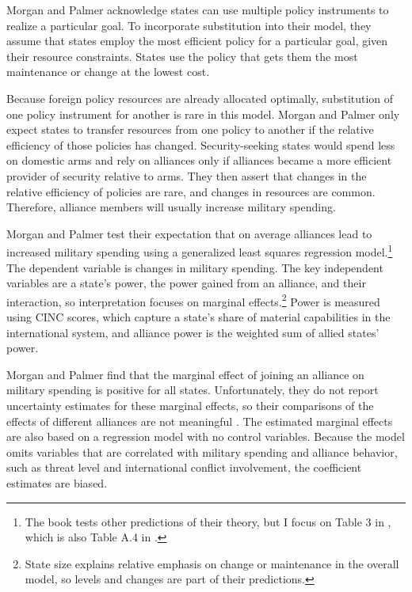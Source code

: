 \documentclass[12pt]{article}
\begin{document}
Morgan and Palmer acknowledge states can use multiple policy instruments to realize a particular goal. 
To incorporate substitution into their model, they assume that states employ the most efficient policy for a particular goal, given their resource constraints. 
States use the policy that gets them the most maintenance or change at the lowest cost.


Because foreign policy resources are already allocated optimally, substitution of one policy instrument for another is rare in this model. 
Morgan and Palmer only expect states to transfer resources from one policy to another if the relative efficiency of those policies has changed. 
Security-seeking states would spend less on domestic arms and rely on alliances only if alliances became a more efficient provider of security relative to arms. 
They then assert that changes in the relative efficiency of policies are rare, and changes in resources are common.
Therefore, alliance members will usually increase military spending. 


Morgan and Palmer test their expectation that on average alliances lead to increased military spending using a generalized least squares regression model.\footnote{The book tests other predictions of their theory, but I focus on Table 3 in \citet{MorganPalmer2003}, which is also Table A.4 in \citet{MorganPalmer2006}.}
The dependent variable is changes in military spending.
The key independent variables are a state's power, the power gained from an alliance, and their interaction, so interpretation focuses on marginal effects.\footnote{State size explains relative emphasis on change or maintenance in the overall model, so levels and changes are part of their predictions.} 
Power is measured using CINC scores, which capture a state's share of material capabilities in the international system, and alliance power is the weighted sum of allied states' power. 

Morgan and Palmer find that the marginal effect of joining an alliance on military spending is positive for all states. 
Unfortunately, they do not report uncertainty estimates for these marginal effects, so their comparisons of the effects of different alliances are not meaningful \citep{BramborClarkGolder2006}. 
The estimated marginal effects are also based on a regression model with no control variables.
Because the model omits variables that are correlated with military spending and alliance behavior, such as threat level and international conflict involvement, the coefficient estimates are biased. 
\end{document}
